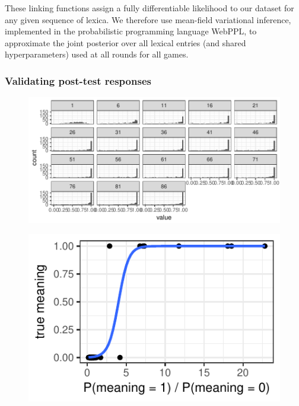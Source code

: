 \documentclass[10pt,letterpaper]{article}
\begin{document}
These linking functions assign a fully differentiable likelihood to our dataset for any given sequence of lexica. We therefore use mean-field variational inference, implemented in the probabilistic programming language WebPPL, to approximate the joint posterior over all lexical entries (and shared hyperparameters) used at all rounds for all games. 

\subsubsection{Validating post-test responses}



\begin{figure}[t]
\begin{center}
{\includegraphics[scale=.55]{wordFormationExample.pdf}}
{\caption{{\footnotesize {}  \label{exp}}}}
\end{center}
\end{figure}

\begin{figure}[t]
\begin{center}
{\includegraphics[scale=.64]{postTestPrediction.pdf}}
{\caption{{\footnotesize {}  \label{exp}}}}
\end{center}
\end{figure}
\end{document}
